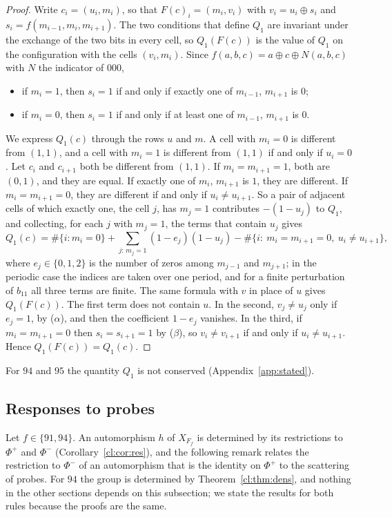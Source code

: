 \begin{proof}
Write $c_i=(u_i,m_i)$, so that $F(c)_i=(m_i,v_i)$ with $v_i=u_i\oplus s_i$ and $s_i=f(m_{i-1},m_i,m_{i+1})$. The two conditions that define $Q_1$ are invariant under the exchange of the two bits in every cell, so $Q_1(F(c))$ is the value of $Q_1$ on the configuration with the cells $(v_i,m_i)$. Since $f(a,b,c)=a\oplus c\oplus N(a,b,c)$ with $N$ the indicator of $000$,
\begin{itemize}
\item[($\alpha$)] if $m_i=1$, then $s_i=1$ if and only if exactly one of $m_{i-1}$, $m_{i+1}$ is $0$;
\item[($\beta$)] if $m_i=0$, then $s_i=1$ if and only if at least one of $m_{i-1}$, $m_{i+1}$ is $0$.
\end{itemize}
We express $Q_1(c)$ through the rows $u$ and $m$. A cell with $m_i=0$ is different from $(1,1)$, and a cell with $m_i=1$ is different from $(1,1)$ if and only if $u_i=0$. Let $c_i$ and $c_{i+1}$ both be different from $(1,1)$. If $m_i=m_{i+1}=1$, both are $(0,1)$, and they are equal. If exactly one of $m_i$, $m_{i+1}$ is $1$, they are different. If $m_i=m_{i+1}=0$, they are different if and only if $u_i\ne u_{i+1}$. So a pair of adjacent cells of which exactly one, the cell $j$, has $m_j=1$ contributes $-(1-u_j)$ to $Q_1$, and collecting, for each $j$ with $m_j=1$, the terms that contain $u_j$ gives
\[
Q_1(c)=\#\{i:m_i=0\}+\sum_{j:\,m_j=1}(1-e_j)(1-u_j)-\#\{i:\ m_i=m_{i+1}=0,\ u_i\ne u_{i+1}\},
\]
where $e_j\in\{0,1,2\}$ is the number of zeros among $m_{j-1}$ and $m_{j+1}$; in the periodic case the indices are taken over one period, and for a finite perturbation of $b_{11}$ all three terms are finite. The same formula with $v$ in place of $u$ gives $Q_1(F(c))$. The first term does not contain $u$. In the second, $v_j\ne u_j$ only if $e_j=1$, by ($\alpha$), and then the coefficient $1-e_j$ vanishes. In the third, if $m_i=m_{i+1}=0$ then $s_i=s_{i+1}=1$ by ($\beta$), so $v_i\ne v_{i+1}$ if and only if $u_i\ne u_{i+1}$. Hence $Q_1(F(c))=Q_1(c)$.
\end{proof}

For $94$ and $95$ the quantity $Q_1$ is not conserved (Appendix~\ref{app:stated}).

\subsection{Responses to probes}\label{cl:sec:IR}

Let $f\in\{91,94\}$. An automorphism $h$ of $X_{F_f}$ is determined by its restrictions to $\Phi^+$ and $\Phi^-$ (Corollary~\ref{cl:cor:res}), and the following remark relates the restriction to $\Phi^-$ of an automorphism that is the identity on $\Phi^+$ to the scattering of probes. For $94$ the group is determined by Theorem~\ref{cl:thm:dens}, and nothing in the other sections depends on this subsection; we state the results for both rules because the proofs are the same.

